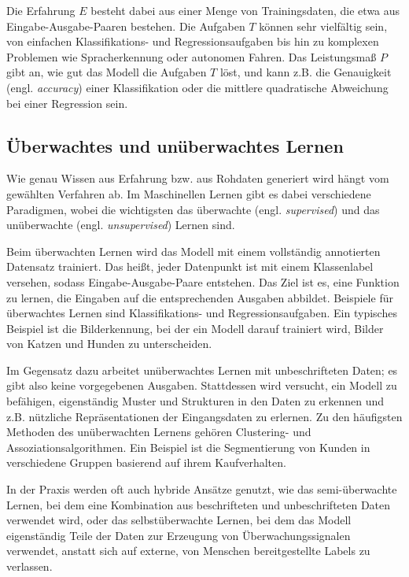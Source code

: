 Die Erfahrung $E$ besteht dabei aus einer Menge von Trainingsdaten, die etwa aus Eingabe-Ausgabe-Paaren bestehen. Die Aufgaben $T$ können sehr vielfältig sein, von einfachen Klassifikations- und Regressionsaufgaben bis hin zu komplexen Problemen wie Spracherkennung oder autonomen Fahren. Das Leistungsmaß $P$ gibt an, wie gut das Modell die Aufgaben $T$ löst, und kann z.B. die Genauigkeit (engl. \textit{accuracy}) einer Klassifikation oder die mittlere quadratische Abweichung bei einer Regression sein.

\subsection{Überwachtes und unüberwachtes Lernen} \label{subsec-sup-unsup}

Wie genau Wissen aus Erfahrung bzw. aus Rohdaten generiert wird hängt vom gewählten Verfahren ab. Im Maschinellen Lernen gibt es dabei verschiedene Paradigmen, wobei die wichtigsten das überwachte (engl. \textit{supervised}) und das unüberwachte (engl. \textit{unsupervised}) Lernen sind.

Beim überwachten Lernen wird das Modell mit einem vollständig annotierten Datensatz trainiert. Das heißt, jeder Datenpunkt ist mit einem Klassenlabel versehen, sodass Eingabe-Ausgabe-Paare entstehen. Das Ziel ist es, eine Funktion zu lernen, die Eingaben auf die entsprechenden Ausgaben abbildet. Beispiele für überwachtes Lernen sind Klassifikations- und Regressionsaufgaben. Ein typisches Beispiel ist die Bilderkennung, bei der ein Modell darauf trainiert wird, Bilder von Katzen und Hunden zu unterscheiden. \cite{}

Im Gegensatz dazu arbeitet unüberwachtes Lernen mit unbeschrifteten Daten; es gibt also keine vorgegebenen Ausgaben. Stattdessen wird versucht, ein Modell zu befähigen, eigenständig Muster und Strukturen in den Daten zu erkennen und z.B. nützliche Repräsentationen der Eingangsdaten zu erlernen. Zu den häufigsten Methoden des unüberwachten Lernens gehören Clustering- und Assoziationsalgorithmen. Ein Beispiel ist die Segmentierung von Kunden in verschiedene Gruppen basierend auf ihrem Kaufverhalten. \cite{}

In der Praxis werden oft auch hybride Ansätze genutzt, wie das semi-überwachte Lernen, bei dem eine Kombination aus beschrifteten und unbeschrifteten Daten verwendet wird, oder das selbstüberwachte Lernen, bei dem das Modell eigenständig Teile der Daten zur Erzeugung von Überwachungssignalen verwendet, anstatt sich auf externe, von Menschen bereitgestellte Labels zu verlassen. \cite{}

